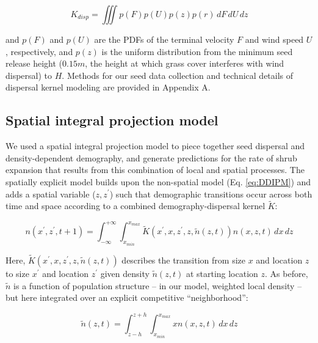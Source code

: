 \documentclass[11pt]{article}\usepackage[]{graphicx}\usepackage[]{color}
\begin{document}
\begin{linenomath*} \label{eq:Kd}
\begin{equation} K_{disp} = \iiint p(F)p(U)p(z)p(r) \,dF\,dU\,dz \end{equation} 
\end{linenomath*} 

and $p(F)$ and $p(U)$ are the PDFs of the terminal velocity $F$ and wind speed $U$, respectively, and $p(z)$ is the uniform distribution from the minimum seed release height ($0.15m$, the height at which grass cover interferes with wind dispersal) to $H$.
Methods for our seed data collection and technical details of dispersal kernel modeling are provided in Appendix A. 

\subsection*{Spatial integral projection model}

We used a spatial integral projection model to piece together seed dispersal and density-dependent demography, and generate predictions for the rate of shrub expansion that results from this combination of local and spatial processes. 
The spatially explicit model builds upon the non-spatial model (Eq. \ref{eq:DDIPM}) and adds a spatial variable ($z,z^\prime$) such that demographic transitions occur across both time and space according to a combined demography-dispersal kernel $\tilde{K}$:

\begin{linenomath*} 
\begin{equation} \label{eq:SIPM}
n(x^\prime,z^\prime,t + 1) = \int_{-\infty}^{+\infty} \int_{x_{min}}^{x_{max}} \tilde{K}(x^\prime,x,z^\prime,z,\tilde{n}(z,t)) n(x,z,t) \,dx \,dz 
\end{equation} 
\end{linenomath*}

Here, $\tilde{K}(x^\prime,x,z^\prime,z,\tilde{n}(z,t))$ describes the transition from size $x$ and location $z$ to size $x^\prime$ and location $z^\prime$ given density $\tilde{n}(z,t)$ at starting location $z$.
As before, $\tilde{n}$ is a function of population structure -- in our model, weighted local density -- but here integrated over an explicit competitive ``neighborhood'': 

\begin{linenomath*} 
\begin{equation} \label{eq:neighborhood}
\tilde{n}(z,t)=\int_{z-h}^{z+h} \int_{x_{min}}^{x_{max}} x n(x,z,t) \,dx \,dz
\end{equation} 
\end{linenomath*}
\end{document}
